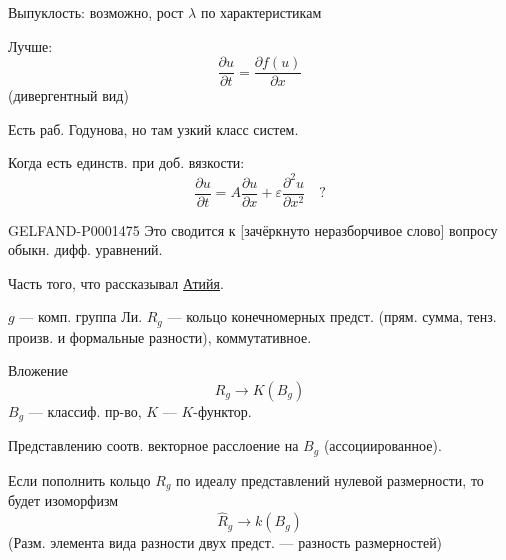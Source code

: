 Выпуклость: возможно, рост $\lambda$ по характеристикам

Лучше:
\begin{equation*}
\frac{\partial u}{\partial t}=\frac{\partial f(u)}{\partial x}
\end{equation*}
(дивергентный вид)

Есть раб. Годунова, но там узкий класс систем.

Когда есть единств. при доб. вязкости:
\begin{equation*}
\frac{\partial u}{\partial t}=A\frac{\partial u}{\partial x}+\varepsilon\frac{\partial^2u}{\partial x^2}\quad?
\end{equation*}

\begin{GelfandAdjacentEvidence}{GELFAND-P000147}{5}
Это сводится к [зачёркнуто неразборчивое слово] вопросу обыкн. дифф. уравнений.
\end{GelfandAdjacentEvidence}




Часть того, что рассказывал \underline{Атийя}.

$g$ — комп. группа Ли. $R_g$ — кольцо конечномерных предст.
(прям. сумма, тенз. произв. и формальные разности), коммутативное.

Вложение
\begin{equation*}
R_g\longrightarrow K(B_g)
\end{equation*}
$B_g$ — классиф. пр-во,
$K$ — $K$-функтор.

Представлению соотв. векторное расслоение на $B_g$ (ассоциированное).

Если пополнить кольцо $R_g$ по идеалу представлений нулевой размерности, то будет изоморфизм
\begin{equation*}
\widehat R_g\longrightarrow k(B_g)
\end{equation*}
(Разм. элемента вида разности двух предст. — разность размерностей)

